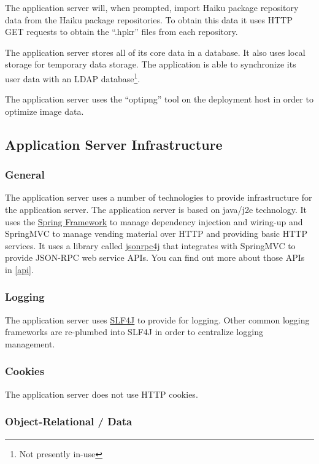 The application server will, when prompted, import Haiku package repository data from the Haiku package repositories.  To obtain this data it uses HTTP GET requests to obtain the ``.hpkr'' files from each repository.

The application server stores all of its core data in a database.  It also uses local storage for temporary data storage.  The application is able to synchronize its user data with an LDAP database\footnote{Not presently in-use}.

The application server uses the ``optipng'' tool on the deployment host in order to optimize image data.

\subsection{Application Server Infrastructure}

\subsubsection{General}

The application server uses a number of technologies to provide infrastructure for the application server.  The application server is based on java/j2e technology.  It uses the \href{http://projects.spring.io/spring-framework/}{Spring Framework} to manage dependency injection and wiring-up and SpringMVC to manage vending material over HTTP and providing basic HTTP services.  It uses a library called \href{https://github.com/briandilley/jsonrpc4j}{jsonrpc4j} that integrates with SpringMVC to provide JSON-RPC web service APIs.  You can find out more about those APIs in \ref{api}.

\subsubsection{Logging}

The application server uses \href{http://www.slf4j.org/}{SLF4J} to provide for logging.  Other common logging frameworks are re-plumbed into SLF4J in order to centralize logging management.

\subsubsection{Cookies}

The application server does not use HTTP cookies.

\subsubsection{Object-Relational / Data}

